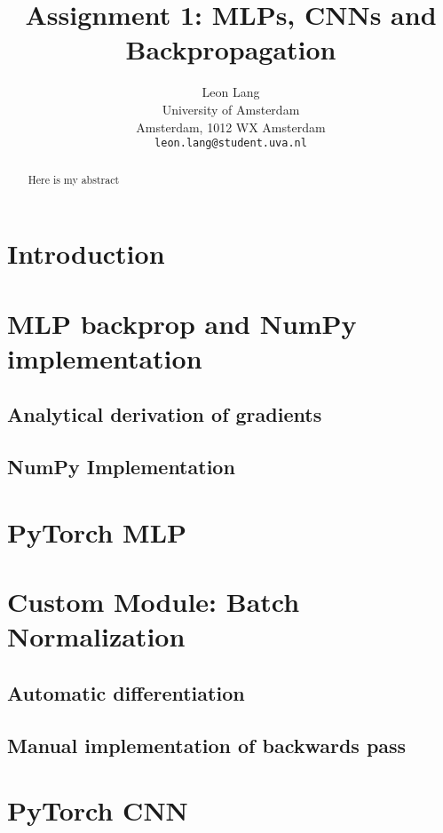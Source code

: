 \documentclass{article}
\title{Assignment 1: MLPs, CNNs and Backpropagation}
\author{%
  Leon Lang \\
  University of Amsterdam\\
  Amsterdam, 1012 WX Amsterdam \\
  \texttt{leon.lang@student.uva.nl}
}
\begin{document}

\maketitle

\begin{abstract}
Here is my abstract
\end{abstract}

\section{Introduction}

\cite{alexnet}

\section{MLP backprop and NumPy implementation}

\subsection{Analytical derivation of gradients}

\subsection{NumPy Implementation}

\section{PyTorch MLP}

\section{Custom Module: Batch Normalization}

\subsection{Automatic differentiation}

\subsection{Manual implementation of backwards pass}

\section{PyTorch CNN}
\end{document}
